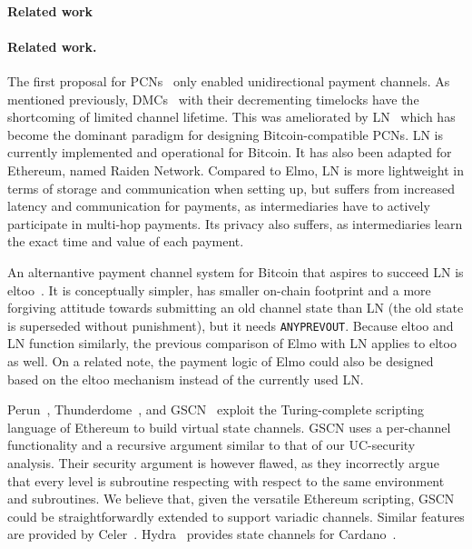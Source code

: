 \makeatletter%
%
  {\paragraph{Related work}}%
  {\paragraph{Related work.}}%
\makeatother%
 The first proposal for PCNs~\cite{spilman} only enabled
 unidirectional payment channels. As mentioned previously, DMCs~\cite{decker}
 with their decrementing timelocks have the shortcoming of limited channel
 lifetime. This was ameliorated by LN~\cite{lightning} which has become the dominant paradigm for designing Bitcoin-compatible PCNs.
 LN is currently implemented and operational for
  Bitcoin. It has also been adapted for Ethereum, named
  Raiden Network. Compared to Elmo, LN is more lightweight in terms of
  storage and communication when setting up, but suffers from increased latency
  and communication for payments, as intermediaries have to actively participate
  in multi-hop payments. Its privacy also suffers, as intermediaries
  learn the exact time and value of each payment.

  An alternantive payment channel system for Bitcoin that aspires to
  succeed LN is eltoo~\cite{eltoo}. It is conceptually simpler,
  has smaller on-chain footprint and a more forgiving attitude towards
  submitting an old channel state than LN (the old state is superseded without punishment), but it needs
  \texttt{ANYPREVOUT}. Because eltoo and LN function similarly, the previous comparison of
  Elmo with LN applies to eltoo as well. On a related note, the payment
  logic of Elmo could also be designed based on the eltoo mechanism instead of
  the currently used LN.

Perun~\cite{perun},
Thunderdome~\cite{avarikioti2025thunderdometimelockfreerationallysecurevirtual},
and GSCN~\cite{DBLP:conf/ccs/DziembowskiFH18} exploit the
  Turing-complete scripting language of Ethereum to build virtual state
  channels.
  GSCN uses a per-channel functionality and a recursive argument similar
  to that of our UC-security analysis. Their security argument is however
  flawed, as they incorrectly argue that every level is subroutine respecting
  with respect to the same environment and subroutines.
  We believe that, given the versatile Ethereum scripting, GSCN could be
  straightforwardly extended to support variadic channels.
  Similar features are provided by Celer~\cite{dong2018celer}.
  Hydra~\cite{cryptoeprint:2020:299} provides state channels for
  Cardano~\cite{cardano}.

